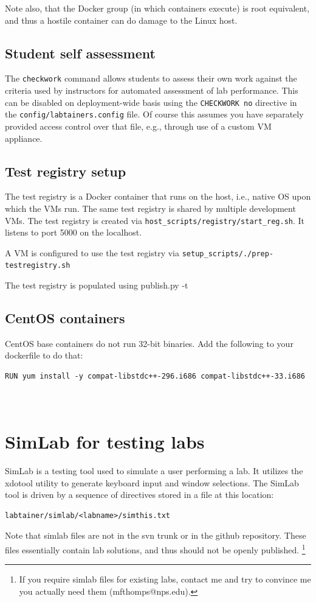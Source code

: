 \documentclass[12pt]{article}
\begin{document}
Note also, that the Docker group (in which containers execute) is root 
equivalent, and thus a hostile container can do damage to the Linux host.

\subsection {Student self assessment}
The {\tt checkwork} command allows students to assess their own work against
the criteria used by instructors for automated assessment of lab performance.
This can be disabled on deployment-wide basis using the {\tt CHECKWORK no} directive
in the {\tt config/labtainers.config} file.  Of course this assumes you have separately
provided access control over that file, e.g., through use of a custom VM appliance.

\subsection {Test registry setup}
The test registry is a Docker container that runs on the host, i.e., native OS
upon which the VMs run.  The same test registry is shared by multiple development VMs.
The test registry is created via {\tt host\_scripts/registry/start\_reg.sh}.  It listens
to port 5000 on the localhost.

A VM is configured to use the test registry via {\tt setup\_scripts/./prep-testregistry.sh}

The test registry is populated using publish.py -t

\subsection {CentOS containers}
CentOS base containers do not run 32-bit binaries.  Add the following to your dockerfile to do that:
\begin{verbatim}
RUN yum install -y compat-libstdc++-296.i686 compat-libstdc++-33.i686
\end{verbatim}

\newpage
\appendix
\section{\\SimLab for testing labs}
\label{testing}
SimLab is a testing tool used to simulate a user performing a lab.  
It utilizes the xdotool utility to
generate keyboard input and window selections.  The SimLab tool is driven by a 
sequence of directives stored in a file at this location:
\begin{verbatim}
labtainer/simlab/<labname>/simthis.txt
\end{verbatim}
Note that simlab files are not in the svn trunk or in the github repository.  These
files essentially contain lab solutions, and thus should not be openly published.
\footnote{If you require simlab files for existing labs, contact me and try to convince
me you actually need them (mfthomps@nps.edu).}
\end{document}
